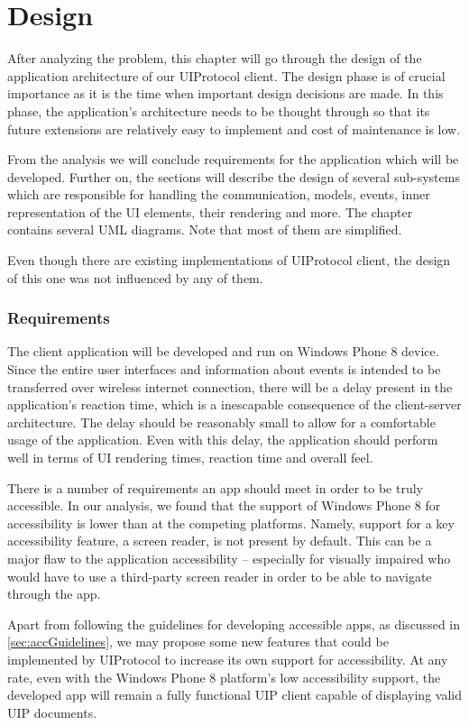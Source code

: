 \chapter{Design}
After analyzing the problem, this chapter will go through the design of the application architecture of our UIProtocol client. The design phase is of crucial importance as it is the time when important design decisions are made. In this phase, the application's architecture needs to be thought through so that its future extensions are relatively easy to implement and cost of maintenance is low.

From the analysis we will conclude requirements for the application which will be developed. Further on, the sections will describe the design of several sub-systems which are responsible for handling the communication, models, events, inner representation of the UI elements, their rendering and more. The chapter contains several UML diagrams. Note that most of them are simplified.

Even though there are existing implementations of UIProtocol client, the design of this one was not influenced by any of them.

\subsection{Requirements}
The client application will be developed and run on Windows Phone 8 device. Since the entire user interfaces and information about events is intended to be transferred over wireless internet connection, there will be a delay present in the application's reaction time, which is a inescapable consequence of the client-server architecture. The delay should be reasonably small to allow for a comfortable usage of the application. Even with this delay, the application should perform well in terms of UI rendering times, reaction time and overall feel.

There is a number of requirements an app should meet in order to be truly accessible. In our analysis, we found that the support of Windows Phone 8 for accessibility is lower than at the competing platforms. Namely, support for a key accessibility feature, a screen reader, is not present by default. This can be a major flaw to the application accessibility – especially for visually impaired who would have to use a third-party screen reader in order to be able to navigate through the app.

Apart from following the guidelines for developing accessible apps, as discussed in \ref{sec:accGuidelines}, we may propose some new features that could be implemented by UIProtocol to increase its own support for accessibility. At any rate, even with the Windows Phone 8 platform's low accessibility support, the developed app will remain a fully functional UIP client capable of displaying valid UIP documents.


